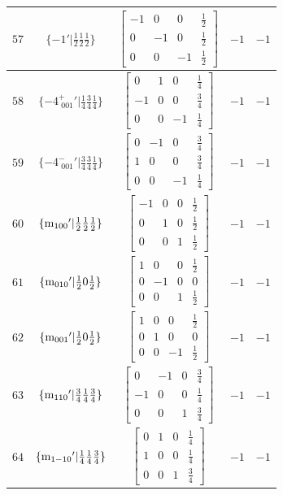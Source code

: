 \documentclass[fleqn,8pt]{jsarticle}
\begin{document}
\begin{longtable}{ccccc}
$ 57 $ & $ \{-1{}'|\frac{1}{2} \frac{1}{2} \frac{1}{2}\} $ & $ \begin{bmatrix} -1 & 0 & 0 & \frac{1}{2} \\ 0 & -1 & 0 & \frac{1}{2} \\ 0 & 0 & -1 & \frac{1}{2} \end{bmatrix} $ & $ -1 $ & $ -1 $ \\ \hline
$ 58 $ & $ \{-4^{+}_{\,\,001}{}'|\frac{1}{4} \frac{3}{4} \frac{1}{4}\} $ & $ \begin{bmatrix} 0 & 1 & 0 & \frac{1}{4} \\ -1 & 0 & 0 & \frac{3}{4} \\ 0 & 0 & -1 & \frac{1}{4} \end{bmatrix} $ & $ -1 $ & $ -1 $ \\ \hline
$ 59 $ & $ \{-4^{-}_{\,\,001}{}'|\frac{3}{4} \frac{3}{4} \frac{1}{4}\} $ & $ \begin{bmatrix} 0 & -1 & 0 & \frac{3}{4} \\ 1 & 0 & 0 & \frac{3}{4} \\ 0 & 0 & -1 & \frac{1}{4} \end{bmatrix} $ & $ -1 $ & $ -1 $ \\ \hline
$ 60 $ & $ \{{\rm m}_{100}{}'|\frac{1}{2} \frac{1}{2} \frac{1}{2}\} $ & $ \begin{bmatrix} -1 & 0 & 0 & \frac{1}{2} \\ 0 & 1 & 0 & \frac{1}{2} \\ 0 & 0 & 1 & \frac{1}{2} \end{bmatrix} $ & $ -1 $ & $ -1 $ \\ \hline
$ 61 $ & $ \{{\rm m}_{010}{}'|\frac{1}{2} 0 \frac{1}{2}\} $ & $ \begin{bmatrix} 1 & 0 & 0 & \frac{1}{2} \\ 0 & -1 & 0 & 0 \\ 0 & 0 & 1 & \frac{1}{2} \end{bmatrix} $ & $ -1 $ & $ -1 $ \\ \hline
$ 62 $ & $ \{{\rm m}_{001}{}'|\frac{1}{2} 0 \frac{1}{2}\} $ & $ \begin{bmatrix} 1 & 0 & 0 & \frac{1}{2} \\ 0 & 1 & 0 & 0 \\ 0 & 0 & -1 & \frac{1}{2} \end{bmatrix} $ & $ -1 $ & $ -1 $ \\ \hline
$ 63 $ & $ \{{\rm m}_{110}{}'|\frac{3}{4} \frac{1}{4} \frac{3}{4}\} $ & $ \begin{bmatrix} 0 & -1 & 0 & \frac{3}{4} \\ -1 & 0 & 0 & \frac{1}{4} \\ 0 & 0 & 1 & \frac{3}{4} \end{bmatrix} $ & $ -1 $ & $ -1 $ \\ \hline
$ 64 $ & $ \{{\rm m}_{1-10}{}'|\frac{1}{4} \frac{1}{4} \frac{3}{4}\} $ & $ \begin{bmatrix} 0 & 1 & 0 & \frac{1}{4} \\ 1 & 0 & 0 & \frac{1}{4} \\ 0 & 0 & 1 & \frac{3}{4} \end{bmatrix} $ & $ -1 $ & $ -1 $ \\
\end{longtable}
\end{document}
